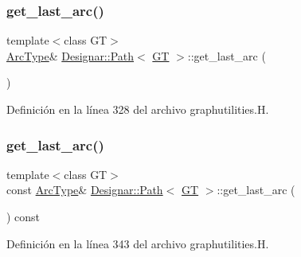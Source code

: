 \subsubsection{\texorpdfstring{get\+\_\+last\+\_\+arc()}{get\_last\_arc()}\hspace{0.1cm}{\footnotesize\ttfamily [1/2]}}
{\footnotesize\ttfamily template$<$class GT$>$ \\
\hyperlink{class_designar_1_1_path_a6e13966351659cedcf3233098b2b7384}{Arc\+Type}\& \hyperlink{class_designar_1_1_path}{Designar\+::\+Path}$<$ \hyperlink{demo-buildgraph_8_c_a3001c40d2c31ca87ed96cd7d1334a55e}{GT} $>$\+::get\+\_\+last\+\_\+arc (\begin{DoxyParamCaption}{ }\end{DoxyParamCaption})\hspace{0.3cm}{\ttfamily [inline]}}



Definición en la línea 328 del archivo graphutilities.\+H.

\mbox{\label{class_designar_1_1_path_a3766fdd25ef3f12780a96319e0b7807e}} 
\subsubsection{\texorpdfstring{get\+\_\+last\+\_\+arc()}{get\_last\_arc()}\hspace{0.1cm}{\footnotesize\ttfamily [2/2]}}
{\footnotesize\ttfamily template$<$class GT$>$ \\
const \hyperlink{class_designar_1_1_path_a6e13966351659cedcf3233098b2b7384}{Arc\+Type}\& \hyperlink{class_designar_1_1_path}{Designar\+::\+Path}$<$ \hyperlink{demo-buildgraph_8_c_a3001c40d2c31ca87ed96cd7d1334a55e}{GT} $>$\+::get\+\_\+last\+\_\+arc (\begin{DoxyParamCaption}{ }\end{DoxyParamCaption}) const\hspace{0.3cm}{\ttfamily [inline]}}



Definición en la línea 343 del archivo graphutilities.\+H.

\mbox{\label{class_designar_1_1_path_aff47c35e439520a807f2a83119a7937b}} 
